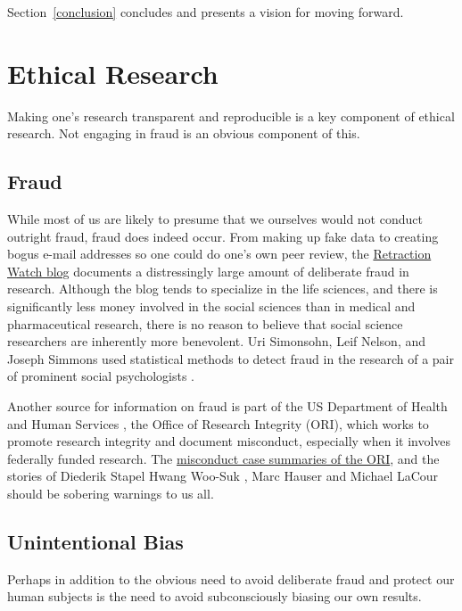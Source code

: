 \documentclass[12pt] {article}
\begin{document}
Section~\ref{conclusion} concludes and presents a vision for moving forward.

\section{Ethical Research}\label{ethical-research}

Making one's research transparent and reproducible is a key component of ethical research. Not engaging in fraud is an obvious component of this.

\subsection{Fraud}\label{fraud}

While most of us are likely to presume that we ourselves would not
conduct outright fraud, fraud does indeed occur. From making up fake
data to creating bogus e-mail addresses so one could do one's own peer
review, the \href{http://www.retractionwatch.com}{Retraction Watch blog}
documents a distressingly large amount of deliberate fraud in research.
Although the blog tends to specialize in the life sciences, and there is significantly less money involved in the social sciences than in medical and pharmaceutical research, there is no reason to believe that social science researchers are inherently
more benevolent. Uri Simonsohn, Leif Nelson, and Joseph Simmons used statistical methods to detect fraud in the research of a pair of prominent social psychologists \citep{simonsohn2013just}. 

Another source for information on fraud is part of the US Department of Health and Human Services
, the Office of Research Integrity (ORI), which works to promote research
integrity and document misconduct, especially when it involves federally
funded research. The \href{http://ori.hhs.gov/case_summary}{misconduct case summaries of the ORI}, and the stories of Diederik Stapel \citep{carey_noted_2011, bhattacharjee_diederik_2013} Hwang Woo-Suk \citep{cyranoski_cloning_2014}, Marc Hauser \citep{johnson_harvard_2012} and Michael LaCour \citep{broockman2015irreg} should be sobering warnings to us all.

\subsection{Unintentional Bias}\label{unintentional-bias}

Perhaps in addition to the obvious need to avoid deliberate fraud and
protect our human subjects is the need to avoid subconsciously biasing
our own results.
\end{document}
